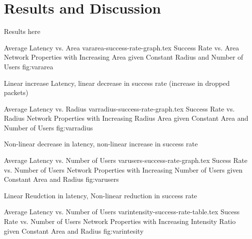 \section{Results and Discussion}
Results here

\par
{}    {Average Latency vs. Area}
                 {vararea-success-rate-graph.tex}       {Success Rate vs. Area}
     {Network Properties with Increasing Area given Constant Radius and Number of Users}
     {fig:vararea}
\par
Linear increase Latency, linear decrease in success rate (increase in dropped packets)

\par
{}  {Average Latency vs. Radius}
                 {varradius-success-rate-graph.tex}     {Success Rate vs. Radius}
    {Network Properties with Increasing Radius Area given Constant Area and Number of Users}
    {fig:varradius}
\par
Non-linear decrease in latency, non-linear increase in success rate

\par
{}   {Average Latency vs. Number of Users}
                 {varusers-success-rate-graph.tex}      {Sucess Rate vs. Number of Users}
    {Network Properties with Increasing Number of Users given Constant Area and Radius}
    {fig:varusers}
\par
Linear Reudction in latency, Non-linear reduction in success rate

\par
{}   {Average Latency vs. Number of Users}
                 {varintensity-success-rate-table.tex}      {Sucess Rate vs. Number of Users}
    {Network Properties with Increasing Intensity Ratio given Constant Area and Radius}
    {fig:varintesity}
\par
